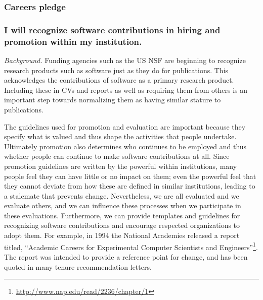 \documentclass[a4paper,UKenglish]{dagman}
\renewcommand{\paragraph}[1]{\subsubsection*{#1}\xspace}
\newcommand{\etc}{\emph{etc.}\xspace}
\begin{document}
\subsubsection*{Careers pledge}

\paragraph{I will recognize software contributions in hiring and promotion within my institution.}

\emph{Background.}
Funding agencies such as the US NSF are beginning to recognize research products such as software just as they do for publications. This acknowledges the contributions of software as a primary research product. Including these in CVs and reports as well as requiring them from others is an important step towards normalizing them as having similar stature to publications.

The guidelines used for promotion and evaluation are important because they specify what is valued and thus shape the activities that people undertake. Ultimately promotion also determines who continues to be employed and thus whether people can continue to make software contributions at all. Since promotion guidelines are written by the powerful within institutions, many people feel they can have little or no impact on them; even the powerful feel that they cannot deviate from how these are defined in similar institutions, leading to a stalemate that prevents change.
Nevertheless, we are all evaluated and we evaluate others, and we can influence these processes when we participate in these evaluations.
Furthermore, we can provide templates and guidelines for recognizing software contributions and encourage respected organizations to adopt them.
For example, in 1994 the National Academies released a report titled, ``Academic Careers for Experimental Computer Scientists and Engineers''\footnote{\url{http://www.nap.edu/read/2236/chapter/1}}. The report was intended to provide a reference point for change, and has been quoted in many tenure recommendation letters.
\end{document}
